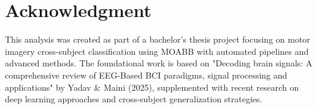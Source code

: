 \documentclass[12pt]{article}
\begin{document}
\section*{Acknowledgment}

This analysis was created as part of a bachelor's thesis project focusing on motor imagery cross-subject classification using MOABB with automated pipelines and advanced methods. The foundational work is based on "Decoding brain signals: A comprehensive review of EEG-Based BCI paradigms, signal processing and applications" by Yadav \& Maini (2025), supplemented with recent research on deep learning approaches and cross-subject generalization strategies.
\end{document}
